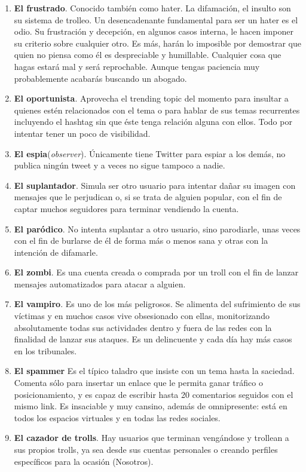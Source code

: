 \documentclass[../all.tex]{subfiles}
\begin{document}
\begin{enumerate}[resume]
        \item \textbf{El frustrado}. Conocido también como hater. La difamación, el insulto son su sistema de trolleo. Un desencadenante fundamental para ser un hater es el odio. Su frustración y decepción, en algunos casos interna, le hacen imponer su criterio sobre cualquier otro. Es más, harán lo imposible por demostrar que quien no piensa como él es despreciable y humillable. Cualquier cosa que hagas estará mal y será reprochable. Aunque tengas paciencia muy probablemente acabarás buscando un abogado.
        \item \textbf{El oportunista}. Aprovecha el trending topic del momento para insultar a quienes estén relacionados con el tema o para hablar de sus temas recurrentes incluyendo el hashtag sin que éste tenga relación alguna con ellos. Todo por intentar tener un poco de visibilidad.
        \item \textbf{El espia}(\textit{observer}). Únicamente tiene Twitter para espiar a los demás, no publica ningún tweet y a veces no sigue tampoco a nadie.
        \item \textbf{El suplantador}. Simula ser otro usuario para intentar dañar su imagen con mensajes que le perjudican o, si se trata de alguien popular, con el fin de captar muchos seguidores para terminar vendiendo la cuenta.
        \item \textbf{El paródico}. No intenta suplantar a otro usuario, sino parodiarle, unas veces con el fin de burlarse de él de forma más o menos sana y otras con la intención de difamarle.
        \item \textbf{El zombi}. Es una cuenta creada o comprada por un troll con el fin de lanzar mensajes automatizados para atacar a alguien.
        \item \textbf{El vampiro}. Es uno de los más peligrosos. Se alimenta del sufrimiento de sus víctimas y en muchos casos vive obsesionado con ellas, monitorizando absolutamente todas sus actividades dentro y fuera de las redes con la finalidad de lanzar sus ataques. Es un delincuente y cada día hay más casos en los tribunales.
        \item \textbf{El spammer} Es el típico taladro que insiste con un tema hasta la saciedad. Comenta sólo para insertar un enlace que le permita ganar tráfico o posicionamiento, y es capaz de escribir hasta 20 comentarios seguidos con el mismo link. Es insaciable y muy cansino, además de omnipresente: está en todos los espacios virtuales y en todas las redes sociales.
        \item \textbf{El cazador de trolls}. Hay usuarios que terminan vengándose y trollean a sus propios trolls, ya sea desde sus cuentas personales o creando perfiles específicos para la ocasión (Nosotros).
    \end{enumerate}
\end{document}
